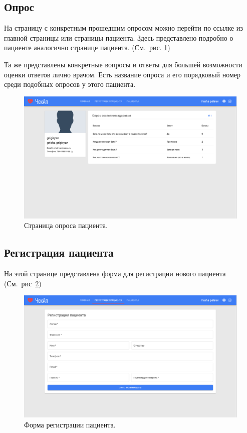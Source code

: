 \subsection{Опрос}\label{subsec:2}
На страницу с конкретным прошедшим опросом можно перейти по ссылке из главной страницы или страницы пациента.
Здесь представлено подробно о пациенте аналогично странице пациента.
(См.\ рис. \ref{fig:figure6})

Та же представлены конкретные вопросы и ответы для большей возможности оценки ответов лично врачом.
Есть название опроса и его порядковый номер среди подобных опросов у этого пациента.
\begin{figure}[ht]
    \includegraphics[width=\textwidth]{images/screenshots/inquirer}
    \caption{Страница опроса пациента.}
    \label{fig:figure6}
\end{figure}

\newpage
\subsection{Регистрация пациента}\label{subsec:-3}
На этой странице представлена форма для регистрации нового пациента (См.\ рис~\ref{fig:figure7})
\begin{figure}[ht]
    \includegraphics[scale=0.17]{images/screenshots/patient_registration}
    \caption{Форма регистрации пациента.}\label{fig:figure7}
\end{figure}